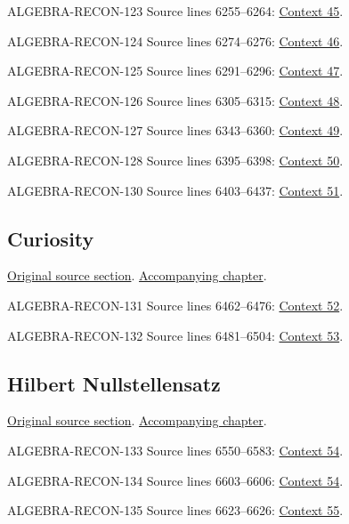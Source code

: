 \begin{AlgebraSourceRoutes}
\item[ALGEBRA-RECON-123] Source lines 6255--6264: \hyperlink{algebra-context-045}{Context 45}.
\item[ALGEBRA-RECON-124] Source lines 6274--6276: \hyperlink{algebra-context-046}{Context 46}.
\item[ALGEBRA-RECON-125] Source lines 6291--6296: \hyperlink{algebra-context-047}{Context 47}.
\item[ALGEBRA-RECON-126] Source lines 6305--6315: \hyperlink{algebra-context-048}{Context 48}.
\item[ALGEBRA-RECON-127] Source lines 6343--6360: \hyperlink{algebra-context-049}{Context 49}.
\item[ALGEBRA-RECON-128] Source lines 6395--6398: \hyperlink{algebra-context-050}{Context 50}.
\item[ALGEBRA-RECON-130] Source lines 6403--6437: \hyperlink{algebra-context-051}{Context 51}.
\end{AlgebraSourceRoutes}

\subsection{Curiosity}
\hypertarget{algebra-source-section-curiosity}{}
\noindent\href{https://github.com/stacks/stacks-project/blob/a04446e57ec1fbc252a871afcec7752fb2807b14/algebra.tex\#L6445}{Original source section}. \href{algebra.pdf\#nameddest=section-curiosity}{Accompanying chapter}.

\begin{AlgebraSourceRoutes}
\item[ALGEBRA-RECON-131] Source lines 6462--6476: \hyperlink{algebra-context-052}{Context 52}.
\item[ALGEBRA-RECON-132] Source lines 6481--6504: \hyperlink{algebra-context-053}{Context 53}.
\end{AlgebraSourceRoutes}

\subsection{Hilbert Nullstellensatz}
\hypertarget{algebra-source-section-nullstellensatz}{}
\noindent\href{https://github.com/stacks/stacks-project/blob/a04446e57ec1fbc252a871afcec7752fb2807b14/algebra.tex\#L6520}{Original source section}. \href{algebra.pdf\#nameddest=section-nullstellensatz}{Accompanying chapter}.

\begin{AlgebraSourceRoutes}
\item[ALGEBRA-RECON-133] Source lines 6550--6583: \hyperlink{algebra-context-054}{Context 54}.
\item[ALGEBRA-RECON-134] Source lines 6603--6606: \hyperlink{algebra-context-054}{Context 54}.
\item[ALGEBRA-RECON-135] Source lines 6623--6626: \hyperlink{algebra-context-055}{Context 55}.
\end{AlgebraSourceRoutes}

